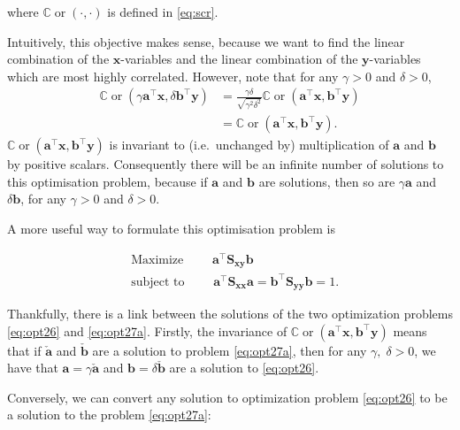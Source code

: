 \documentclass[
]{book}
\theoremstyle{definition}
\theoremstyle{definition}
\theoremstyle{definition}
\theoremstyle{definition}
\theoremstyle{remark}
\begin{document}
where \({\mathbb{C}\operatorname{or}}(\cdot,\cdot)\) is defined in \eqref{eq:scr}.

Intuitively, this objective makes sense, because we want to find the linear combination of the \(\mathbf x\)-variables and the linear combination of the \(\mathbf y\)-variables which are most highly correlated.
However, note that for any \(\gamma>0\) and \(\delta>0\),
\begin{align}
  {\mathbb{C}\operatorname{or}}(\gamma\mathbf a^\top \mathbf x, \delta \mathbf b^\top \mathbf y)&= \frac{\gamma \delta}{\sqrt{\gamma^2 \delta^2}}{\mathbb{C}\operatorname{or}}(\mathbf a^\top \mathbf x,\mathbf b^\top \mathbf y)\\
  &={\mathbb{C}\operatorname{or}}(\mathbf a^\top \mathbf x,\mathbf b^\top \mathbf y).
  \label{eq:invar}
  \end{align}
\({\mathbb{C}\operatorname{or}}(\mathbf a^\top \mathbf x,\mathbf b^\top \mathbf y)\) is invariant to (i.e.~unchanged by) multiplication of \(\mathbf a\) and \(\mathbf b\) by positive scalars. Consequently there will be an infinite number of solutions to this optimisation problem, because if \(\mathbf a\) and \(\mathbf b\) are solutions, then so are \(\gamma \mathbf a\) and \(\delta \mathbf b\), for any \(\gamma>0\) and \(\delta>0\).

A more useful way to formulate this optimisation problem is

\begin{align}
&\mbox{Maximize }\qquad \mathbf a^\top \mathbf S_{\mathbf x\mathbf y}\mathbf b
\label{eq:opt27a}\\
  &\mbox{subject to } \qquad  \mathbf a^\top \mathbf S_{\mathbf x\mathbf x}\mathbf a=\mathbf b^\top \mathbf S_{\mathbf y\mathbf y}\mathbf b=1.\nonumber
\end{align}

Thankfully, there is a link between the solutions of the two optimization problems \eqref{eq:opt26} and \eqref{eq:opt27a}. Firstly, the invariance of \({\mathbb{C}\operatorname{or}}(\mathbf a^\top \mathbf x, \mathbf b^\top \mathbf y)\) means that if
\(\check{\mathbf a}\) and \(\check{\mathbf b}\) are a solution to problem \eqref{eq:opt27a}, then for any \(\gamma,\;\delta>0\), we have that \(\mathbf a=\gamma \check{\mathbf a}\) and \(\mathbf b=\delta \check{\mathbf b}\) are a solution to \eqref{eq:opt26}.

Conversely, we can convert any solution to optimization problem \eqref{eq:opt26} to be a solution to the problem \eqref{eq:opt27a}:
\end{document}
